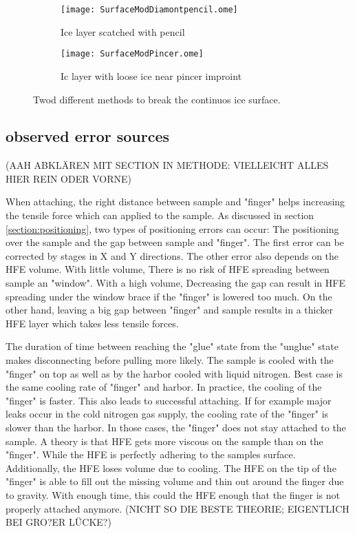 \begin{figure}[hbt!]
	\centering
	\begin{subfigure}[]{0.45\textwidth}
		\centering
		\texttt{[image: SurfaceModDiamontpencil.ome]}
		\caption{Ice layer scatched with pencil}
	\end{subfigure}
	\begin{subfigure}[]{0.45\textwidth}
		\centering
		\texttt{[image: SurfaceModPincer.ome]}
		\caption{Ic layer with loose ice near pincer improint}
	\end{subfigure}
	\caption{Twod different methods to break the continuos ice surface.}
	\label{fig:SurfaceMod}
\end{figure}

\FloatBarrier

\subsection{observed error sources}

(AAH ABKLÄREN MIT SECTION IN METHODE: VIELLEICHT ALLES HIER REIN ODER VORNE)

When attaching, the right distance between sample and "finger" helps increasing the tensile force which can applied to the sample. As discussed in section \ref{section:positioning}, two types of positioning errors can occur: The positioning over the sample and the gap between sample and "finger". The first error can be corrected by stages in X and Y directions. The other error also depends on the HFE volume. With little volume, There is no risk of HFE spreading between sample an "window". With a high volume, Decreasing the gap can result in HFE spreading under the window brace if the "finger" is lowered too much. On the other hand, leaving a big gap between "finger" and sample results in a thicker HFE layer which takes less tensile forces.

The duration of time between reaching the "glue" state from the "unglue" state makes disconnecting before pulling more likely. The sample is cooled with the "finger" on top as well as by the harbor cooled with liquid nitrogen. Best case is the same cooling rate of "finger" and harbor. In practice, the cooling of the "finger" is faster. This also leads to successful attaching. If for example major leaks occur in the cold nitrogen gas supply, the cooling rate of the "finger" is slower than the harbor. In those cases, the "finger" does not stay attached to the sample. A theory is that HFE gets more viscous on the sample than on the "finger". While the HFE is perfectly adhering to the samples surface. Additionally, the HFE loses volume due to cooling. The HFE on the tip of the "finger" is able to fill out the missing volume and thin out around the finger due to gravity. With enough time, this could the HFE enough that the finger is not properly attached anymore. (NICHT SO DIE BESTE THEORIE; EIGENTLICH BEI GRO?ER LÜCKE?)


